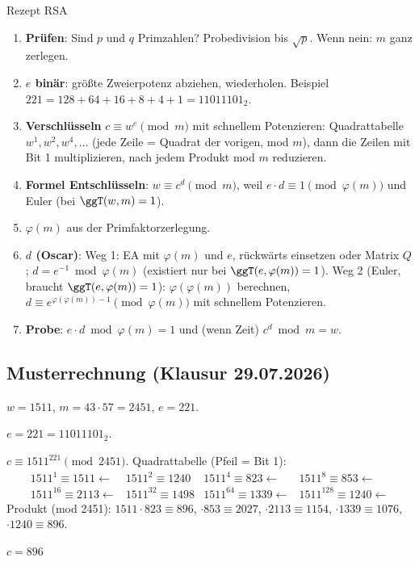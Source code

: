 \begin{rezept}{Rezept RSA}
\begin{enumerate}
\item \textbf{Prüfen}: Sind $p$ und $q$ Primzahlen? Probedivision bis $\sqrt{p}$. Wenn nein: $m$ ganz zerlegen.
\item \textbf{$e$ binär}: größte Zweierpotenz abziehen, wiederholen. Beispiel $221 = 128 + 64 + 16 + 8 + 4 + 1 = 11011101_2$.
\item \textbf{Verschlüsseln} $c \equiv w^e \pmod m$ mit schnellem Potenzieren:
  Quadrattabelle $w^1, w^2, w^4, \dots$ (jede Zeile = Quadrat der vorigen, mod $m$), dann die Zeilen mit Bit 1 multiplizieren,
  nach jedem Produkt mod $m$ reduzieren.
\item \textbf{Formel Entschlüsseln}: $w \equiv c^d \pmod m$, weil $e \cdot d \equiv 1 \pmod{\varphi(m)}$ und Euler (bei $\ggT(w, m) = 1$).
\item \textbf{$\varphi(m)$} aus der Primfaktorzerlegung.
\item \textbf{$d$ (Oscar)}: Weg 1: EA mit $\varphi(m)$ und $e$, rückwärts einsetzen oder Matrix $Q$; $d = e^{-1} \bmod \varphi(m)$ (existiert nur bei $\ggT(e, \varphi(m)) = 1$).
      Weg 2 (Euler, braucht $\ggT(e, \varphi(m)) = 1$): $\varphi(\varphi(m))$ berechnen, $d \equiv e^{\varphi(\varphi(m))-1} \pmod{\varphi(m)}$ mit schnellem Potenzieren.
\item \textbf{Probe}: $e \cdot d \bmod \varphi(m) = 1$ und (wenn Zeit) $c^d \bmod m = w$.
\end{enumerate}
\end{rezept}

\subsection*{Musterrechnung (Klausur 29.07.2026)}
$w = 1511$, $m = 43 \cdot 57 = 2451$, $e = 221$.

 $e = 221 = 11011101_2$.

 $c \equiv 1511^{221} \pmod{2451}$. Quadrattabelle (Pfeil = Bit 1):
\[
\begin{array}{llll}
1511^{1} \equiv 1511 \leftarrow & 1511^{2} \equiv 1240 & 1511^{4} \equiv 823 \leftarrow & 1511^{8} \equiv 853 \leftarrow\\
1511^{16} \equiv 2113 \leftarrow & 1511^{32} \equiv 1498 & 1511^{64} \equiv 1339 \leftarrow & 1511^{128} \equiv 1240 \leftarrow
\end{array}
\]
Produkt (mod 2451): $1511 \cdot 823 \equiv 896$, $\cdot 853 \equiv 2027$, $\cdot 2113 \equiv 1154$, $\cdot 1339 \equiv 1076$, $\cdot 1240 \equiv 896$.
\begin{ergebnis} $c = 896$ \end{ergebnis}

